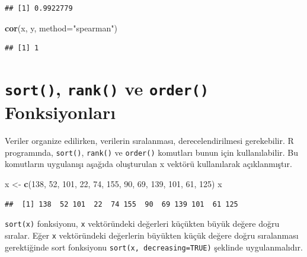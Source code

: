 \documentclass[
]{book}
\newenvironment{Shaded}{\begin{snugshade}}{\end{snugshade}}
\newcommand{\AttributeTok}[1]{\textcolor[rgb]{0.13,0.29,0.53}{#1}}
\newcommand{\DecValTok}[1]{\textcolor[rgb]{0.00,0.00,0.81}{#1}}
\newcommand{\FunctionTok}[1]{\textcolor[rgb]{0.13,0.29,0.53}{\textbf{#1}}}
\newcommand{\NormalTok}[1]{#1}
\newcommand{\OtherTok}[1]{\textcolor[rgb]{0.56,0.35,0.01}{#1}}
\newcommand{\StringTok}[1]{\textcolor[rgb]{0.31,0.60,0.02}{#1}}
\begin{document}
\begin{verbatim}
## [1] 0.9922779
\end{verbatim}

\begin{Shaded}
\begin{Highlighting}[]
\FunctionTok{cor}\NormalTok{(x, y, }\AttributeTok{method=}\StringTok{"spearman"}\NormalTok{)}
\end{Highlighting}
\end{Shaded}

\begin{verbatim}
## [1] 1
\end{verbatim}

\section{\texorpdfstring{\texttt{sort()}, \texttt{rank()} ve \texttt{order()} Fonksiyonları}{sort(), rank() ve order() Fonksiyonları}}\label{sort-rank-ve-order-fonksiyonlarux131}

Veriler organize edilirken, verilerin sıralanması, derecelendirilmesi gerekebilir. R programında, \texttt{sort()}, \texttt{rank()} ve \texttt{order()} komutları bunun için kullanılabilir. Bu komutların uygulanışı aşağıda oluşturulan x vektörü kullanılarak açıklanmıştır.

\begin{Shaded}
\begin{Highlighting}[]
\NormalTok{x }\OtherTok{\textless{}{-}} \FunctionTok{c}\NormalTok{(}\DecValTok{138}\NormalTok{, }\DecValTok{52}\NormalTok{, }\DecValTok{101}\NormalTok{, }\DecValTok{22}\NormalTok{, }\DecValTok{74}\NormalTok{, }\DecValTok{155}\NormalTok{, }\DecValTok{90}\NormalTok{, }\DecValTok{69}\NormalTok{, }\DecValTok{139}\NormalTok{, }\DecValTok{101}\NormalTok{, }\DecValTok{61}\NormalTok{, }\DecValTok{125}\NormalTok{) }
\NormalTok{x }
\end{Highlighting}
\end{Shaded}

\begin{verbatim}
##  [1] 138  52 101  22  74 155  90  69 139 101  61 125
\end{verbatim}

\texttt{sort(x)} fonksiyonu, \texttt{x} vektöründeki değerleri küçükten büyük değere doğru sıralar. Eğer \texttt{x} vektöründeki değerlerin büyükten küçük değere doğru sıralanması gerektiğinde sort fonksiyonu \texttt{sort(x,\ decreasing=TRUE)} şeklinde uygulanmalıdır.
\end{document}
